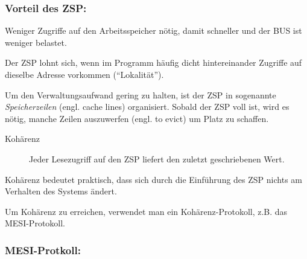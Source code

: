 \subsubsection*{Vorteil des ZSP:}
Weniger Zugriffe auf den Arbeitsspeicher nötig, damit schneller und der BUS ist weniger belastet.

Der ZSP lohnt sich, wenn im Programm häufig dicht hintereinander Zugriffe auf dieselbe Adresse vorkommen ("`Lokalität"').

Um den Verwaltungsaufwand gering zu halten, ist der ZSP in sogenannte \emph{Speicherzeilen} (engl. cache lines) organisiert. Sobald der ZSP voll ist, wird es nötig, manche Zeilen auszuwerfen (engl. to evict) um Platz zu schaffen.

\begin{description}
	\item[Kohärenz] Jeder Lesezugriff auf den ZSP liefert den zuletzt geschriebenen Wert.
\end{description}

Kohärenz bedeutet praktisch, dass sich durch die Einführung des ZSP nichts am Verhalten des Systems ändert.

Um Kohärenz zu erreichen, verwendet man ein Kohärenz-Protokoll, z.B. das MESI-Protokoll.

\subsubsection*{MESI-Protkoll:}

